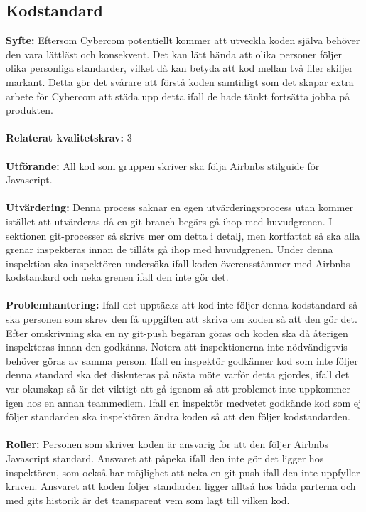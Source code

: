 \documentclass[10pt]{article}
\begin{document}
	\subsection{Kodstandard}
	\textbf{Syfte:}	Eftersom Cybercom potentiellt kommer att utveckla koden själva behöver den vara lättläst och konsekvent. Det kan lätt hända att olika personer följer olika personliga standarder, vilket då kan betyda att kod mellan två filer skiljer markant. Detta gör det svårare att förstå koden samtidigt som det skapar extra arbete för Cybercom att städa upp detta ifall de hade tänkt fortsätta jobba på produkten.
	\\\\
	\textbf{Relaterat kvalitetskrav:} 3
	\\\\
	\textbf{Utförande:} All kod som gruppen skriver ska följa Airbnbs stilguide för Javascript\cite{bib-airbnb}.
	\\\\
	\textbf{Utvärdering:} Denna process saknar en egen utvärderingsprocess utan kommer istället att utvärderas då en git-branch begärs gå ihop med huvudgrenen. I sektionen git-processer så skrivs mer om detta i detalj, men kortfattat så ska alla grenar inspekteras innan de tillåts gå ihop med huvudgrenen. Under denna inspektion ska inspektören undersöka ifall koden överensstämmer med Airbnbs kodstandard och neka grenen ifall den inte gör det.
	\\\\
	\textbf{Problemhantering:} Ifall det upptäcks att kod inte följer denna kodstandard så ska personen som skrev den få uppgiften att skriva om koden så att den gör det. Efter omskrivning ska en ny git-push begäran göras och koden ska då återigen inspekteras innan den godkänns. Notera att inspektionerna inte nödvändigtvis behöver göras av samma person.
	Ifall en inspektör godkänner kod som inte följer denna standard ska det diskuteras på nästa möte varför detta gjordes, ifall det var okunskap så är det viktigt att gå igenom så att problemet inte uppkommer igen hos en annan teammedlem. Ifall en inspektör medvetet godkände kod som ej följer standarden ska inspektören ändra koden så att den följer kodstandarden.
	\\\\
	\textbf{Roller:} Personen som skriver koden är ansvarig för att den följer Airbnbs Javascript standard. Ansvaret att påpeka ifall den inte gör det ligger hos inspektören, som också har möjlighet att neka en git-push ifall den inte uppfyller kraven. Ansvaret att koden följer standarden ligger alltså hos båda parterna och med gits historik är det transparent vem som lagt till vilken kod.
	
\end{document}
